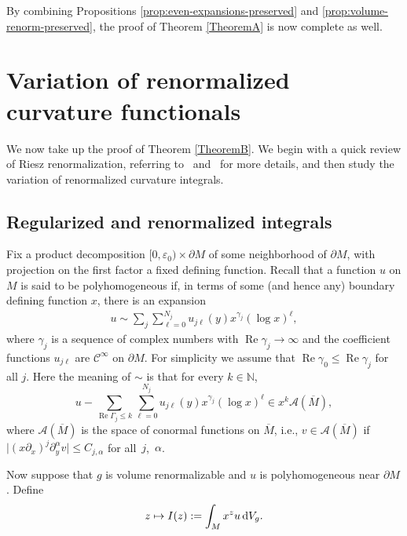 \documentclass[pdftex]{sigma}
\numberwithin{equation}{section}
\renewcommand{\epsilon}{\varepsilon}
\newcommand{\del}{\partial}
\newcommand{\calA}{\mathcal A}
\newcommand{\calC}{\mathcal C}
\newcommand{\Mbar}{\overline{M}}
\DeclareMathOperator{\re}{Re}
\begin{document}
By combining Propositions \ref{prop:even-expansions-preserved} and \ref{prop:volume-renorm-preserved}, the proof of Theorem \ref{TheoremA} is now complete as well.

\section{Variation of renormalized curvature functionals} \label{VarofCurvFcl}

We now take up the proof of Theorem \ref{TheoremB}. We begin with a quick review of Riesz renormalization, referring to~\cite{Albin} and~\cite{DGH} for more details, and then study the variation of renormalized curvature integrals.

\subsection{Regularized and renormalized integrals}

Fix a product decomposition $[0,\epsilon_0) \times \del M$ of some neighborhood of $\del M$, with projection on the first factor a fixed defining function.
Recall that a function $u$ on $M$ is said to be polyhomogeneous if, in terms of some (and hence any) boundary defining function $x$,
there is an expansion
\begin{gather*}%
u \sim \sum_{j} \sum_{\ell=0}^{N_j} u_{j \ell}(y) x^{\gamma_j} (\log x)^\ell,
\end{gather*}
where $\gamma_j$ is a sequence of complex numbers with $\re \gamma_j \to \infty$ and the coefficient functions $u_{j\ell}$ are $\calC^\infty$ on $\del M$.
For simplicity we assume that $\re \gamma_0 \leq \re \gamma_j$ for all $j$. Here the meaning of $\sim$ is that for every $k \in \mathbb{N}$,
\[ u - \sum_{\re \Gamma_j \leq k} \sum_{\ell=0}^{N_j} u_{j \ell}(y) x^{\gamma_j} (\log x)^\ell \in x^k \calA(\Mbar),
\]
where $\calA(\Mbar)$ is the space of conormal functions on $\Mbar$, i.e., $v \in \calA(\Mbar)$ if
$\big|(x\del_x)^j \del_y^\alpha v\big| \leq C_{j,\alpha}$ for all~$j$,~$\alpha$.

Now suppose that $g$ is volume renormalizable and $u$ is polyhomogeneous near $\partial M$. Define
\begin{gather*}%
z \mapsto I(z):=\int_M x^z u \,{\rm d} V_g.
\end{gather*}
\end{document}
